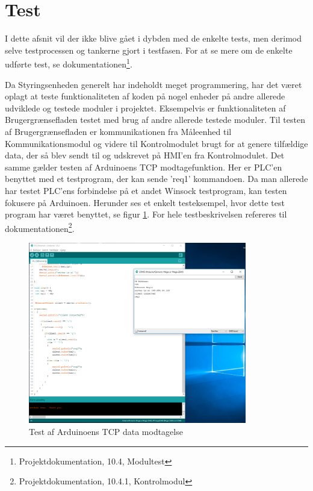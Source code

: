 
\section{Test}

I dette afsnit vil der ikke blive gået i dybden med de enkelte tests, men derimod selve testprocessen og tankerne gjort i testfasen. For at se mere om de enkelte udførte test, se dokumentationen\footnote{Projektdokumentation, 10.4, Modultest}.

Da Styringsenheden generelt har indeholdt meget programmering, har det været oplagt at teste funktionaliteten af koden på nogel enheder på andre allerede udviklede og testede moduler i projektet.  Eksempelvis er funktionaliteten af Brugergrænsefladen testet med brug af andre allerede testede moduler. Til testen af Brugergrænsefladen er kommunikationen fra Måleenhed til Kommunikationsmodul og videre til Kontrolmodulet brugt for at genere tilfældige data, der så blev sendt til og udskrevet på HMI'en fra Kontrolmodulet. Det samme gælder testen af Arduinoens TCP modtagefunktion. Her er PLC'en benyttet  med et testprogram, der kan sende 'req1' kommandoen. Da man allerede har testet PLC'ens forbindelse på et andet Winsock testprogram, kan testen fokusere på Arduinoen. Herunder ses et enkelt testeksempel, hvor dette test program har været benyttet, se figur \ref{fig:EthernetTest}. For hele testbeskrivelsen refereres til dokumentationen\footnote{Projektdokumentation, 10.4.1, Kontrolmodul}.


\begin{figure}[H] %
	\centering
	\includegraphics[width=0.85\textwidth]{figure/EthernetTest}
	\caption{Test af Arduinoens TCP data modtagelse}
	\label{fig:EthernetTest}
\end{figure}

